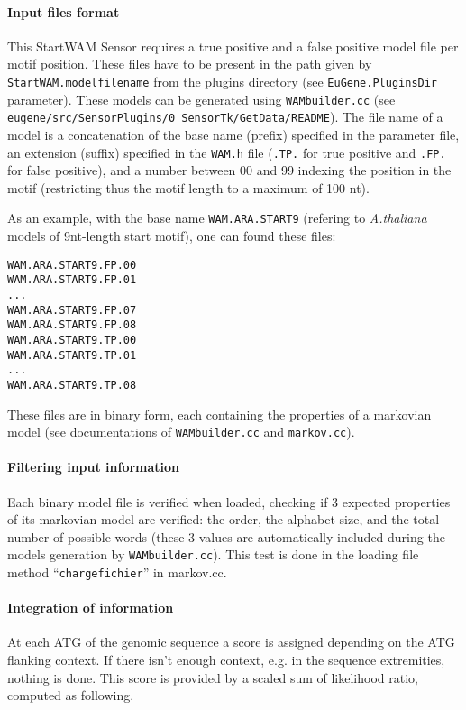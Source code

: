\paragraph{Input files format}

This StartWAM Sensor requires a true positive and a false positive
model file per motif position. These files have to be present in the
path given by \texttt{StartWAM.modelfilename} from the plugins
directory (see \texttt{EuGene.PluginsDir} parameter). These models can
be generated using \texttt{WAMbuilder.cc} (see
\texttt{eugene/src/SensorPlugins/0\_SensorTk/GetData/README}).  The
file name of a model is a concatenation of the base name (prefix)
specified in the parameter file, an extension (suffix) specified in
the \texttt{WAM.h} file (\texttt{.TP.} for true positive and
\texttt{.FP.}  for false positive), and a number between 00 and 99
indexing the position in the motif (restricting thus the motif length
to a maximum of 100 nt).

As an example, with the base name \texttt{WAM.ARA.START9} (refering to
{\em A.thaliana} models of 9nt-length start motif), one can found these files:
\begin{Verbatim}[fontsize=\small]
WAM.ARA.START9.FP.00
WAM.ARA.START9.FP.01
...
WAM.ARA.START9.FP.07
WAM.ARA.START9.FP.08
WAM.ARA.START9.TP.00
WAM.ARA.START9.TP.01
...
WAM.ARA.START9.TP.08
\end{Verbatim}

These files are in binary form, each containing the properties of a
markovian model (see documentations of \texttt{WAMbuilder.cc} and
\texttt{markov.cc}).

\paragraph{Filtering input information}

Each binary model file is verified when loaded, checking if 3 expected
properties of its markovian model are verified: the order, the
alphabet size, and the total number of possible words (these 3 values
are automatically included during the models generation by
\texttt{WAMbuilder.cc}). This test is done in the loading file method
``\texttt{chargefichier}'' in markov.cc.

\paragraph{Integration of information}

At each ATG of the genomic sequence a score is assigned depending on
the ATG flanking context. If there isn't enough context, e.g. in the
sequence extremities, nothing is done.  This score is provided by a
scaled sum of likelihood ratio, computed as following.

